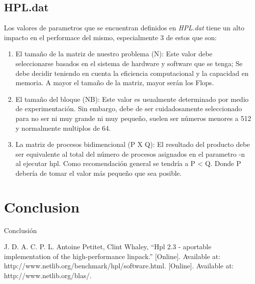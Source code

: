 \documentclass[conference]{IEEEtran}
\begin{document}
\subsection{HPL.dat}
Los valores de parametros que se encuentran definidos en \textit{HPL.dat} tiene
un alto impacto en el performace del mismo, especialmente 3 de estos que son:

\begin{enumerate}
    \item El tamaño de la matriz de nuestro problema (N): Este valor debe seleccionarse basados
    en el sistema de hardware y software que se tenga; Se debe decidir teniendo en cuenta la 
    eficiencia computacional y la capacidad en memoria. A mayor el tamaño de la matriz, mayor 
    serán los Flops.
    
    \item El tamaño del bloque (NB): Este valor es usualmente determinado por medio de experimentación.
    Sin embargo, debe de ser cuidadosamente seleccionado para no ser ni muy grande ni muy pequeño, suelen 
    ser números menores a 512 y normalmente multiplos de 64.
    
    \item La matriz de procesos bidimencional (P X Q): El resultado del producto debe ser equivalente al total
    del número de procesos asignados en el parametro -n al ejecutar hpl. Como recomendación general se tendría
    a P < Q. Donde P debería de tomar el valor más pequeño que sea posible.
\end{enumerate}
    

    
\section{Conclusion}

Conclusión

\begin{thebibliography}{00}
 J. D. A. C. P. L. Antoine Petitet, Clint Whaley, “Hpl 2.3 - aportable implementation of the high-performance linpack.” [Online]. Available at: http://www.netlib.org/benchmark/hpl/software.html.
 [Online]. Available at: http://www.netlib.org/blas/.
\end{thebibliography}
\end{document}
